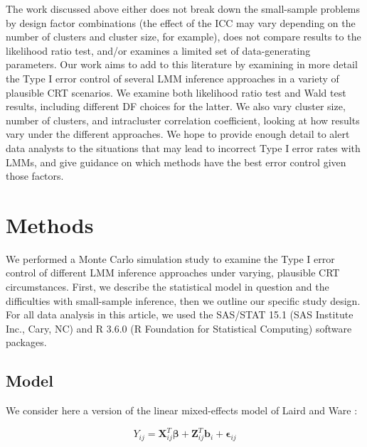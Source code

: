 \documentclass[twocolumn]{bmcart}%
\begin{document}
The work discussed above either does not break down the small-sample problems by design factor combinations (the effect of the ICC may vary depending on the number of clusters and cluster size, for example), does not compare results to the likelihood ratio test, and/or examines a limited set of data-generating parameters. Our work aims to add to this literature by examining in more detail the Type I error control of several LMM inference approaches in a variety of plausible CRT scenarios. We examine both likelihood ratio test and Wald test results, including different DF choices for the latter. We also vary cluster size, number of clusters, and intracluster correlation coefficient, looking at how results vary under the different approaches. We hope to provide enough detail to alert data analysts to the situations that may lead to incorrect Type I error rates with LMMs, and give guidance on which methods have the best error control given those factors.

\section*{Methods}


We performed a Monte Carlo simulation study to examine the Type I error control of different LMM inference approaches under varying, plausible CRT circumstances. First, we describe the statistical model in question and the difficulties with small-sample inference, then we outline our specific study design. For all data analysis in this article, we used the SAS/STAT 15.1 (SAS Institute Inc., Cary, NC) and R 3.6.0 (R Foundation for Statistical Computing) software packages.

\subsection*{Model}

We consider here a version of the linear mixed-effects model of Laird and Ware \cite{laird_random-effects_1982}:

\begin{equation}
  \label{eq:1}
  Y_{ij} = \mathbf{X}_{ij}^T\boldsymbol{\beta} + \mathbf{Z}_{ij}^T \boldsymbol{b}_i + \mathbf{\epsilon}_{ij}
\end{equation}
\end{document}
